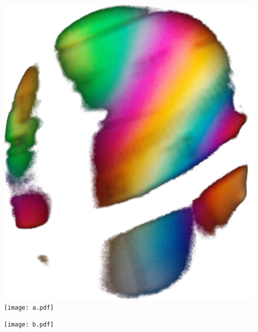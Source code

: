 \includegraphics[height=0.3\textheight]{Geodreieck.jpg}
\texttt{[image: a.pdf]}

\vfill
\texttt{[image: b.pdf]}

